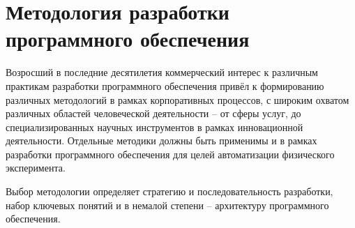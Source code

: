 \chapter{Методология разработки программного обеспечения}

Возросший в последние десятилетия коммерческий интерес к
различным практикам разработки программного обеспечения
привёл к формированию различных методологий в рамках
корпоративных процессов, с широким охватом различных областей
человеческой деятельности -- от сферы услуг, до специализированных
научных инструментов в рамках инновационной деятельности.
Отдельные методики должны быть применимы и в рамках разработки
программного обеспечения для целей автоматизации физического
эксперимента.

Выбор методологии определяет стратегию и последовательность
разработки, набор ключевых понятий и в немалой степени -- архитектуру
программного обеспечения.












